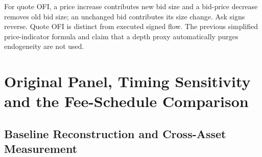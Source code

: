 For quote OFI, a price increase contributes new bid size and a bid-price decrease removes old bid size; an unchanged bid contributes its size change. Ask signs reverse. Quote OFI is distinct from executed signed flow. The previous simplified price-indicator formula and claim that a depth proxy automatically purges endogeneity are not used.

\section{Original Panel, Timing Sensitivity and the Fee-Schedule Comparison}
\label{sec:baseline_natural_exp}
\subsection{Baseline Reconstruction and Cross-Asset Measurement}
\begin{table}[htbp]
\centering\footnotesize\setlength{\tabcolsep}{3pt}
\caption{Original-panel measurement reconstruction: equal-weight means across assets within each of 96 sampled dates, followed by date means and exploratory Student intervals. The 768 study units contain 66,316,704 raw one-second rows; primary fits use 6,513,239 ten-second transitions. These are reduced-form diagnostics.}
\label{tab:binance_panel}
\end{table}
